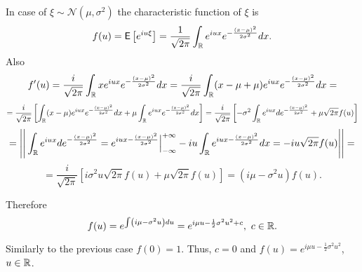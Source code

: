In case of $\xi \sim \mathcal N (\mu, \sigma^2)$ the characteristic function of $\xi$ is \[ f(u) = \textsf E \left[ e^{iu\xi} \right] = \frac{1}{\sqrt{2 \pi}} \int_{\mathbb R} e^{iux} e^{-\frac{(x - \mu)^2}{2 \sigma^2}} dx. \] Also \[ f'(u) = \frac{i}{\sqrt{2 \pi}} \int_{\mathbb R} x e^{iux} e^{-\frac{(x - \mu)^2}{2 \sigma^2}} dx = \frac{i}{\sqrt{2 \pi}} \int_{\mathbb R} (x - \mu + \mu) e^{iux} e^{-\frac{(x - \mu)^2}{2 \sigma^2}} dx = \] \[ = \frac{i}{\sqrt{2 \pi}} \left[ \int_{\mathbb R} (x - \mu) e^{iux} e^{-\frac{(x - \mu)^2}{2 \sigma^2}} dx + \mu \int_{\mathbb R} e^{iux} e^{-\frac{(x - \mu)^2}{2 \sigma^2}} dx \right] = \frac{i}{\sqrt{2 \pi}} \left[ - \sigma^2 \int_{\mathbb R} e^{iux} d e^{-\frac{(x - \mu)^2}{2 \sigma^2}} + \mu \sqrt{2 \pi} f(u) \right] \] \[ = \Bigg| \Bigg| \int_{\mathbb R} e^{iux} d e^{-\frac{(x - \mu)^2}{2 \sigma^2}} = e^{iux - \frac{(x - \mu)^2}{2 \sigma^2}} \Big|_{-\infty}^{+\infty} - i u \int_{\mathbb R} e^{iux - \frac{(x - \mu)^2}{2 \sigma^2}} dx = - iu \sqrt{2 \pi} f(u) \Bigg| \Bigg| = \] \[ = \frac{i}{\sqrt{2 \pi}} \left[ i \sigma^2 u \sqrt{2 \pi} f(u) + \mu \sqrt{2 \pi} f(u) \right] = \left( i \mu - \sigma^2 u \right) f(u). \]

Therefore \[ f(u) = e^{\int \left( i \mu - \sigma^2 u \right) du } = e^{i \mu u - \frac 12 \sigma^2 u^2 + c}, \text{ } c \in \mathbb R. \]

Similarly to the previous case $f(0) = 1$. Thus, $c = 0$ and $f(u) = e^{i \mu u - \frac 12 \sigma^2 u^2}$, $u \in \mathbb R$.

